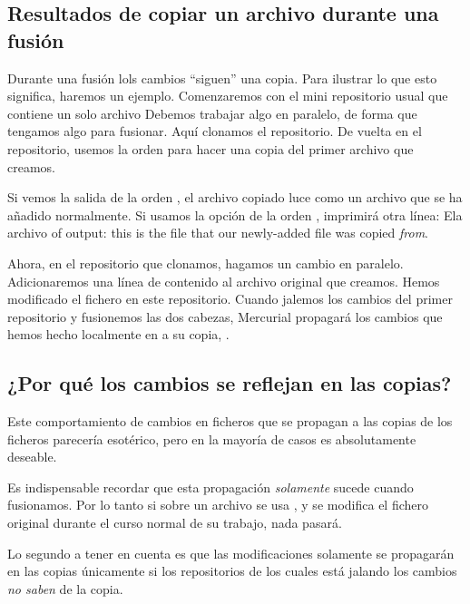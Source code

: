 \subsection{Resultados de copiar un archivo durante una fusión}

Durante una fusión lols cambios ``siguen'' una copia.  Para ilustrar
lo que esto significa, haremos un ejemplo.  Comenzaremos con el mini
repositorio usual que contiene un solo archivo
Debemos trabajar algo en paralelo, de forma que tengamos algo para
fusionar. Aquí clonamos el repositorio.
De vuelta en el repositorio, usemos la orden  para hacer
una copia del primer archivo que creamos.

Si vemos la salida de la orden , el archivo copiado luce
como un archivo que se ha añadido normalmente.
Si usamos la opción  de la orden ,
imprimirá otra línea: Ela archivo of output: this is the file that our newly-added
file was copied \emph{from}.

Ahora, en el repositorio que clonamos, hagamos un cambio en
paralelo. Adicionaremos una línea de contenido al archivo original que
creamos.
Hemos modificado el fichero  en este
repositorio. Cuando jalemos los cambios del primer repositorio y
fusionemos las dos cabezas, Mercurial propagará los cambios que hemos
hecho localmente en  a su copia, .

\subsection{¿Por qué los cambios se reflejan en las copias?}
\label{sec:daily:why-copy}

Este comportamiento de cambios en ficheros que se propagan a las
copias de los ficheros parecería esotérico, pero en la mayoría de
casos es absolutamente deseable.

Es indispensable recordar que esta propagación \emph{solamente} sucede
cuando fusionamos.  Por lo tanto si sobre un archivo se usa
, y se modifica el fichero original durante el curso
normal de su trabajo, nada pasará.

Lo segundo a tener en cuenta es que las modificaciones solamente se
propagarán en las copias únicamente si los repositorios de los cuales
está jalando los cambios \emph{no saben} de la copia.


